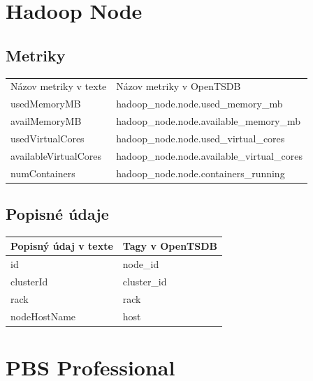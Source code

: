 \documentclass[printed,11pt,twoside,color,cover,table]{fithesis3}
\begin{document}
\section{Hadoop Node}
\subsection{Metriky}
\begin{center}
    \begin{tabular}{| l | l |}
    \hline
    Názov metriky v texte & Názov metriky v OpenTSDB\\
	usedMemoryMB & hadoop\_node.node.used\_memory\_mb\\ \hline
    availMemoryMB & hadoop\_node.node.available\_memory\_mb\\ \hline
    usedVirtualCores & hadoop\_node.node.used\_virtual\_cores\\ \hline
    availableVirtualCores & hadoop\_node.node.available\_virtual\_cores\\ \hline 
    numContainers & hadoop\_node.node.containers\_running\\ \hline
    \end{tabular}
\end{center}

\subsection{Popisné údaje}
\begin{center}
    \begin{tabular}{| l | l |}
    \hline
    Popisný údaj v texte & Tagy v OpenTSDB \\ \hline
    id & node\_id\\ \hline
    clusterId & cluster\_id\\ \hline
    rack & rack\\ \hline
    nodeHostName & host\\ \hline
    \end{tabular}
\end{center}

\section{PBS Professional}
\end{document}
